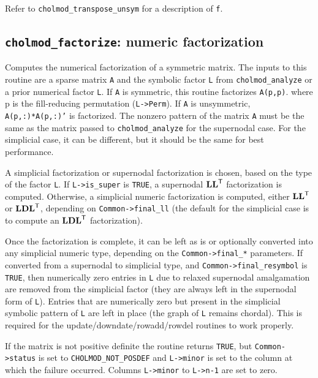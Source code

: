 \documentclass[11pt]{article}
\newcommand{\m}[1]{{\bf{#1}}}       %
\newcommand{\tr}{^{\sf T}}          %
\begin{document}
Refer to {\tt cholmod\_transpose\_unsym} for a description of {\tt f}.

\newpage \subsection{{\tt cholmod\_factorize}: numeric factorization}


Computes the numerical factorization of a symmetric matrix.  The %
inputs to this routine are a sparse matrix {\tt A} and the symbolic factor {\tt L} from
{\tt cholmod\_analyze} or a prior numerical factor {\tt L}.  If {\tt A} is symmetric, this
routine factorizes {\tt A(p,p)}. %
where p is the fill-reducing permutation ({\tt L->Perm}).  If {\tt A} is unsymmetric,
{\tt A(p,:)*A(p,:)'} %
is factorized.  %
The nonzero pattern of the matrix {\tt A} must be the same as the matrix passed to
{\tt cholmod\_analyze} for the supernodal case.  For the simplicial case, it can
be different, but it should be the same for best performance. %

A simplicial factorization or supernodal factorization is chosen, based on
the type of the factor {\tt L}.  If {\tt L->is\_super} is {\tt TRUE}, a supernodal $\m{LL}\tr$
factorization is computed.  Otherwise, a simplicial numeric factorization
is computed, either $\m{LL}\tr$ or $\m{LDL}\tr$, depending on {\tt Common->final\_ll}
(the default for the simplicial case is to compute an $\m{LDL}\tr$ factorization).

Once the factorization is complete, it can be left as is or optionally
converted into any simplicial numeric type, depending on the
{\tt Common->final\_*} parameters.  If converted from a supernodal to simplicial
type, and {\tt Common->final\_resymbol} is {\tt TRUE}, then numerically
zero entries in {\tt L} due to relaxed supernodal amalgamation are removed from
the simplicial factor (they are always left in the supernodal form of {\tt L}).
Entries that are numerically zero but present in the simplicial symbolic
pattern of {\tt L} are left in place (the graph of {\tt L} remains chordal).
This is required for the update/downdate/rowadd/rowdel routines to work
properly.

If the matrix is not positive definite the routine returns {\tt TRUE}, but
{\tt Common->status} is set to {\tt CHOLMOD\_NOT\_POSDEF} and {\tt L->minor} is set to the
column at which the failure occurred.  Columns {\tt L->minor} to {\tt L->n-1}
are set to zero.
\end{document}
